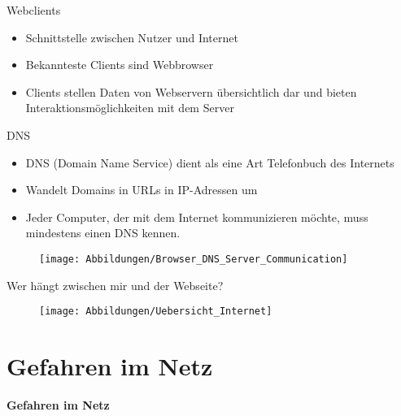 \documentclass[hyperref={colorlinks,linkcolor=white}, utf8]{beamer}
\begin{document}
	\begin{frame}{Webclients}
		\begin{itemize}
			\item Schnittstelle zwischen Nutzer und Internet
			\item Bekannteste Clients sind Webbrowser
			\item Clients stellen Daten von Webservern übersichtlich dar und bieten Interaktionsmöglichkeiten mit dem Server
		\end{itemize}
	\end{frame}
	
	\begin{frame}{DNS}
		\begin{itemize}
			\item DNS (Domain Name Service) dient als eine Art Telefonbuch des Internets
			\item Wandelt Domains in URLs in IP-Adressen um
			\item Jeder Computer, der mit dem Internet kommunizieren möchte, muss mindestens einen DNS kennen.
		\end{itemize}
	
		\begin{figure}[H]
			\texttt{[image: Abbildungen/Browser\_DNS\_Server\_Communication]}
		\end{figure}				
	\end{frame}
	
	\begin{frame}{Wer hängt zwischen mir und der Webseite?}
		\begin{figure}[H]
			\texttt{[image: Abbildungen/Uebersicht\_Internet]}
			\label{fig:Übersicht des Internets}
		\end{figure}
	\end{frame}
	
	\section{Gefahren im Netz}
	\begin{frame}
		\centering \huge \textbf{Gefahren im Netz}
	\end{frame}
	
\end{document}
